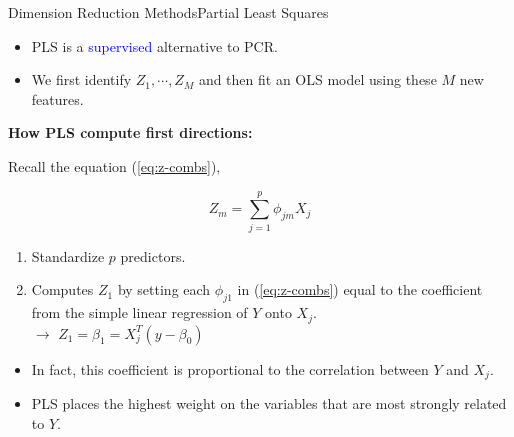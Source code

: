 \begin{frame}{Dimension Reduction Methods}{Partial Least Squares}

    \begin{itemize}
        \item PLS is a \textcolor{blue}{supervised} alternative to PCR. \pause 

        \item  We first identify  $Z_1 , \cdots , Z_M$ and then fit an OLS model using these $M$ new features. \pause 
    \end{itemize}

\textbf{How PLS compute first directions: } \pause 

Recall the equation (\ref{eq:z-combs}), \pause 

\begin{equation*}
    Z_m = \sum_{j=1}^p \phi_{jm} X_j
\end{equation*} \pause 

\begin{enumerate}
    \item Standardize $p$ predictors. \pause 
    \item Computes $Z_1$ by setting each $\phi_{j1}$ in (\ref{eq:z-combs}) equal to the coeﬃcient from the simple linear regression of $Y$ onto $X_j$. \\ \pause 
    $\rightarrow$ $Z_1 = \beta_1 = X_j^T(y - \beta_0)$ \pause 
\end{enumerate}

\begin{itemize}
    \item In fact, this coeﬃcient is proportional to the correlation between $Y$ and $X_j$. \pause 
    
    \item PLS places the highest weight on the variables that are most strongly related to $Y$.

    
    
\end{itemize}


\end{frame}

